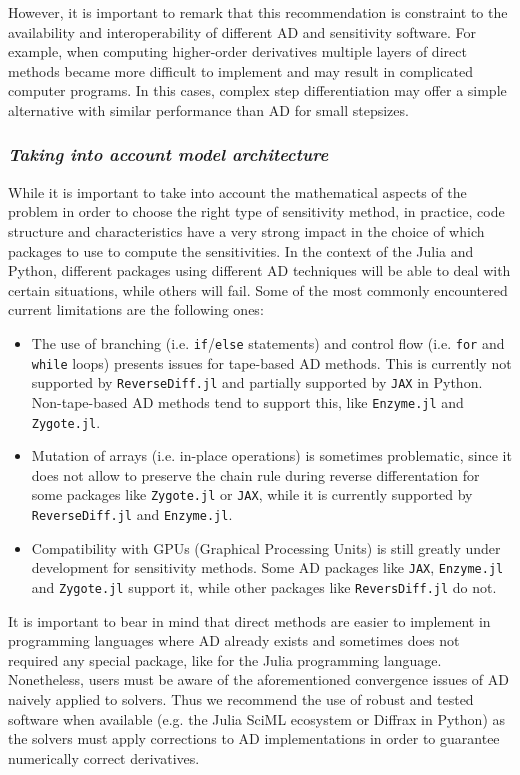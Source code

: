 However, it is important to remark that this recommendation is constraint to the availability and interoperability of different AD and sensitivity software. 
For example, when computing higher-order derivatives multiple layers of direct methods became more difficult to implement and may result in complicated computer programs.
In this cases, complex step differentiation may offer a simple alternative with similar performance than AD for small stepsizes. 

\subsubsection*{\textit{Taking into account model architecture}}

While it is important to take into account the mathematical aspects of the problem in order to choose the right type of sensitivity method, in practice, code structure and characteristics have a very strong impact in the choice of which packages to use to compute the sensitivities. 
In the context of the Julia and Python, different packages using different AD techniques will be able to deal with certain situations, while others will fail. 
Some of the most commonly encountered current limitations are the following ones:
\begin{itemize}
    \item The use of branching (i.e. \texttt{if}/\texttt{else} statements) and control flow (i.e. \texttt{for} and \texttt{while} loops) presents issues for tape-based AD methods. 
    This is currently not supported by \texttt{ReverseDiff.jl} and partially supported by \texttt{JAX} in Python. 
    Non-tape-based AD methods tend to support this, like \texttt{Enzyme.jl} and \texttt{Zygote.jl}.
    \item Mutation of arrays (i.e. in-place operations) is sometimes problematic, since it does not allow to preserve the chain rule during reverse differentation for some packages like \texttt{Zygote.jl} or \texttt{JAX}, while it is currently supported by \texttt{ReverseDiff.jl} and \texttt{Enzyme.jl}.
    \item Compatibility with GPUs (Graphical Processing Units) is still greatly under development for sensitivity methods. 
    Some AD packages like \texttt{JAX}, \texttt{Enzyme.jl} and \texttt{Zygote.jl} support it, while other packages like \texttt{ReversDiff.jl} do not. 
\end{itemize}

It is important to bear in mind that direct methods are easier to implement in programming languages where AD already exists and sometimes does not required any special package, like for the Julia programming language.
Nonetheless, users must be aware of the aforementioned convergence issues of AD naively applied to solvers. 
Thus we recommend the use of robust and tested software when available (e.g. the Julia SciML ecosystem or Diffrax in Python) as the solvers must apply corrections to AD implementations in order to guarantee numerically correct derivatives.

